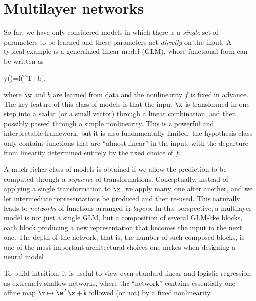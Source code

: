 
\chapter{Multilayer networks}


So far, we have only considered models in which there is a \emph{single} set of parameters to be learned and these parameters act \emph{directly} on the input. A typical example is a generalized linear model (GLM), whose functional form can be written as
\begin{myequation}
y(\x)=f(\w^{T}\x+b),
\end{myequation}
where $\w$ and $b$ are learned from data and the nonlinearity $f$ is fixed in advance. The key feature of this class of models is that the input $\x$ is transformed in one step into a scalar (or a small vector) through a linear combination, and then possibly passed through a simple nonlinearity. This is a powerful and interpretable framework, but it is also fundamentally limited: the hypothesis class only contains functions that are ``almost linear'' in the input, with the departure from linearity determined entirely by the fixed choice of $f$.

A much richer class of models is obtained if we allow the prediction to be computed through a \emph{sequence} of transformations. Conceptually, instead of applying a single transformation to $\x$, we apply many, one after another, and we let intermediate representations be produced and then re-used. This naturally leads to \emph{networks} of functions arranged in \emph{layers}. In this perspective, a multilayer model is not just a single GLM, but a composition of several GLM-like blocks, each block producing a new representation that becomes the input to the next one. The depth of the network, that is, the number of such composed blocks, is one of the most important architectural choices one makes when designing a neural model.

To build intuition, it is useful to view even standard linear and logistic regression as extremely shallow networks, where the ``network'' contains essentially one affine map $\x \mapsto \w^T \x + b$ followed (or not) by a fixed nonlinearity.

